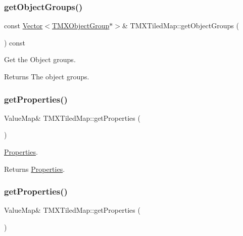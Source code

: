 \subsubsection{\texorpdfstring{get\+Object\+Groups()}{getObjectGroups()}\hspace{0.1cm}{\footnotesize\ttfamily [2/2]}}
{\footnotesize\ttfamily const \hyperlink{classVector}{Vector}$<$\hyperlink{classTMXObjectGroup}{T\+M\+X\+Object\+Group}$\ast$$>$\& T\+M\+X\+Tiled\+Map\+::get\+Object\+Groups (\begin{DoxyParamCaption}{ }\end{DoxyParamCaption}) const\hspace{0.3cm}{\ttfamily [inline]}}

Get the Object groups.

\begin{DoxyReturn}{Returns}
The object groups. 
\end{DoxyReturn}
\mbox{\label{classTMXTiledMap_a66e86941819b9a9d60c3cda0c4285b2a}} 
\subsubsection{\texorpdfstring{get\+Properties()}{getProperties()}\hspace{0.1cm}{\footnotesize\ttfamily [1/2]}}
{\footnotesize\ttfamily Value\+Map\& T\+M\+X\+Tiled\+Map\+::get\+Properties (\begin{DoxyParamCaption}{ }\end{DoxyParamCaption})\hspace{0.3cm}{\ttfamily [inline]}}

\hyperlink{classProperties}{Properties}.

\begin{DoxyReturn}{Returns}
\hyperlink{classProperties}{Properties}. 
\end{DoxyReturn}
\mbox{\label{classTMXTiledMap_a66e86941819b9a9d60c3cda0c4285b2a}} 
\subsubsection{\texorpdfstring{get\+Properties()}{getProperties()}\hspace{0.1cm}{\footnotesize\ttfamily [2/2]}}
{\footnotesize\ttfamily Value\+Map\& T\+M\+X\+Tiled\+Map\+::get\+Properties (\begin{DoxyParamCaption}{ }\end{DoxyParamCaption})\hspace{0.3cm}{\ttfamily [inline]}}

